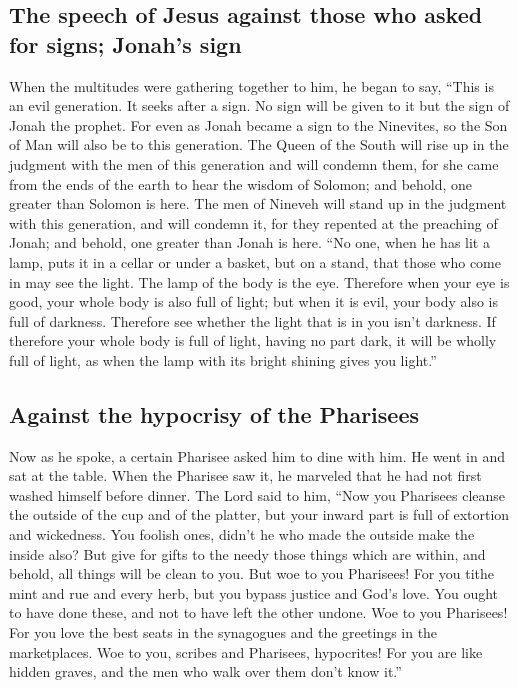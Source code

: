 \hypertarget{the-speech-of-jesus-against-those-who-asked-for-signs-jonahs-sign}{%
\subsection{The speech of Jesus against those who asked for signs;
Jonah's
sign}\label{the-speech-of-jesus-against-those-who-asked-for-signs-jonahs-sign}}

 When the multitudes were gathering together to him, he
began to say, ``This is an evil generation. It seeks after a sign. No
sign will be given to it but the sign of Jonah the prophet.
 For even as Jonah became a sign to the Ninevites, so the
Son of Man will also be to this generation.  The Queen of
the South will rise up in the judgment with the men of this generation
and will condemn them, for she came from the ends of the earth to hear
the wisdom of Solomon; and behold, one greater than Solomon is here.
 The men of Nineveh will stand up in the judgment with
this generation, and will condemn it, for they repented at the preaching
of Jonah; and behold, one greater than Jonah is here. 
``No one, when he has lit a lamp, puts it in a cellar or under a basket,
but on a stand, that those who come in may see the light.
 The lamp of the body is the eye. Therefore when your eye
is good, your whole body is also full of light; but when it is evil,
your body also is full of darkness.  Therefore see
whether the light that is in you isn't darkness.  If
therefore your whole body is full of light, having no part dark, it will
be wholly full of light, as when the lamp with its bright shining gives
you light.''

\hypertarget{against-the-hypocrisy-of-the-pharisees}{%
\subsection{Against the hypocrisy of the
Pharisees}\label{against-the-hypocrisy-of-the-pharisees}}

 Now as he spoke, a certain Pharisee asked him to dine
with him. He went in and sat at the table.  When the
Pharisee saw it, he marveled that he had not first washed himself before
dinner.  The Lord said to him, ``Now you Pharisees
cleanse the outside of the cup and of the platter, but your inward part
is full of extortion and wickedness.  You foolish ones,
didn't he who made the outside make the inside also?  But
give for gifts to the needy those things which are within, and behold,
all things will be clean to you.  But woe to you
Pharisees! For you tithe mint and rue and every herb, but you bypass
justice and God's love. You ought to have done these, and not to have
left the other undone.  Woe to you Pharisees! For you
love the best seats in the synagogues and the greetings in the
marketplaces.  Woe to you, scribes and Pharisees,
hypocrites! For you are like hidden graves, and the men who walk over
them don't know it.''

